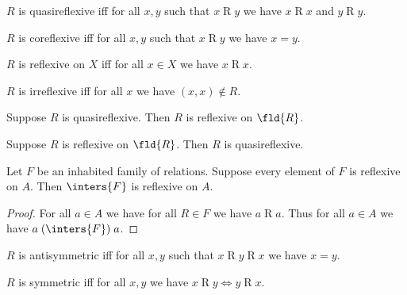 \begin{definition}\label{quasireflexive}
    $R$ is quasireflexive iff
    for all $x, y$ such that $x\mathrel{R} y$
    we have $x\mathrel{R}x$ and $y\mathrel{R}y$.
\end{definition}

\begin{definition}\label{coreflexive}
    $R$ is coreflexive iff
    for all $x, y$ such that $x\mathrel{R} y$
    we have $x = y$.
\end{definition}

\begin{definition}\label{reflexive_on}
    $R$ is reflexive on $X$ iff
    for all $x\in X$
    we have $x\mathrel{R}x$.
\end{definition}

\begin{definition}\label{irreflexive}
    $R$ is irreflexive iff
    for all $x$ we have $(x,x)\notin R$.
\end{definition}


\begin{proposition}\label{quasireflexive_implies_reflexive_on_fld}
    Suppose $R$ is quasireflexive.
    Then $R$ is reflexive on $\fld{R}$.
\end{proposition}

\begin{proposition}\label{reflexive_on_fld_impliesquasireflexive}
    Suppose $R$ is reflexive on $\fld{R}$.
    Then $R$ is quasireflexive.
\end{proposition}

\begin{proposition}\label{inters_of_family_of_reflexive_relations_is_reflexive}
    Let $F$ be an inhabited family of relations.
    Suppose every element of $F$ is reflexive on $A$.
    Then $\inters{F}$ is reflexive on $A$.
\end{proposition}
\begin{proof}
    For all $a\in A$ we have for all $R\in F$ we have $a\mathrel{R} a$.
    Thus for all $a\in A$ we have $a\mathrel{(\inters{F})} a$.
\end{proof}

\begin{definition}\label{antisymmetric}
    $R$ is antisymmetric iff
    for all $x, y$ such that $x\mathrel{R}y\mathrel{R}x$
    we have $x = y$.
\end{definition}

\begin{definition}[Symmetry]\label{symmetric}
    $R$ is symmetric iff
    for all $x, y$ we have
    $x\mathrel{R} y \iff y\mathrel{R}x$.
\end{definition}


